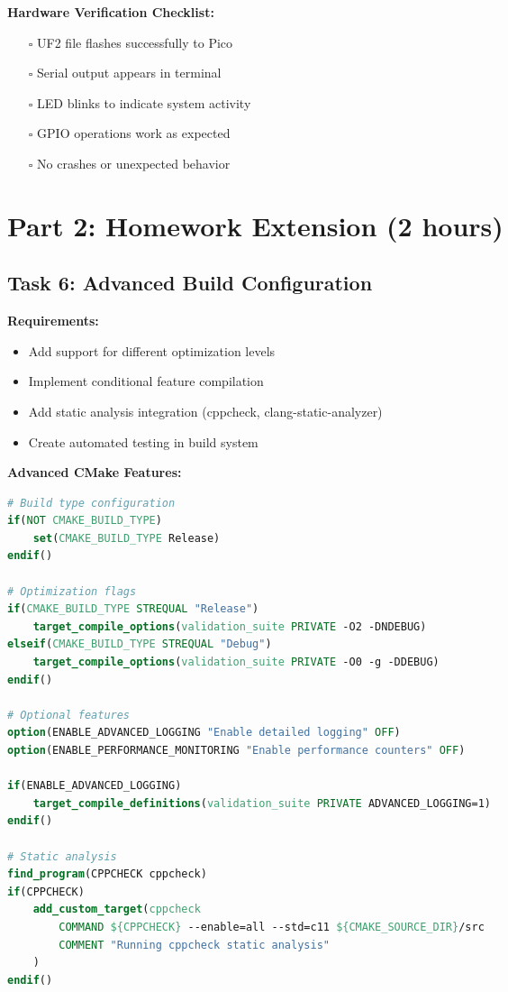 \documentclass[11pt,a4paper]{article}
\begin{document}
\textbf{Hardware Verification Checklist:}
\begin{itemize}
    \item[$\square$] UF2 file flashes successfully to Pico
    \item[$\square$] Serial output appears in terminal
    \item[$\square$] LED blinks to indicate system activity
    \item[$\square$] GPIO operations work as expected
    \item[$\square$] No crashes or unexpected behavior
\end{itemize}

\section{Part 2: Homework Extension (2 hours)}

\subsection{Task 6: Advanced Build Configuration}

\textbf{Requirements:}
\begin{itemize}
    \item Add support for different optimization levels
    \item Implement conditional feature compilation
    \item Add static analysis integration (cppcheck, clang-static-analyzer)
    \item Create automated testing in build system
\end{itemize}

\textbf{Advanced CMake Features:}
\begin{lstlisting}[language=cmake]
# Build type configuration
if(NOT CMAKE_BUILD_TYPE)
    set(CMAKE_BUILD_TYPE Release)
endif()

# Optimization flags
if(CMAKE_BUILD_TYPE STREQUAL "Release")
    target_compile_options(validation_suite PRIVATE -O2 -DNDEBUG)
elseif(CMAKE_BUILD_TYPE STREQUAL "Debug")
    target_compile_options(validation_suite PRIVATE -O0 -g -DDEBUG)
endif()

# Optional features
option(ENABLE_ADVANCED_LOGGING "Enable detailed logging" OFF)
option(ENABLE_PERFORMANCE_MONITORING "Enable performance counters" OFF)

if(ENABLE_ADVANCED_LOGGING)
    target_compile_definitions(validation_suite PRIVATE ADVANCED_LOGGING=1)
endif()

# Static analysis
find_program(CPPCHECK cppcheck)
if(CPPCHECK)
    add_custom_target(cppcheck
        COMMAND ${CPPCHECK} --enable=all --std=c11 ${CMAKE_SOURCE_DIR}/src
        COMMENT "Running cppcheck static analysis"
    )
endif()
\end{lstlisting}
\end{document}
